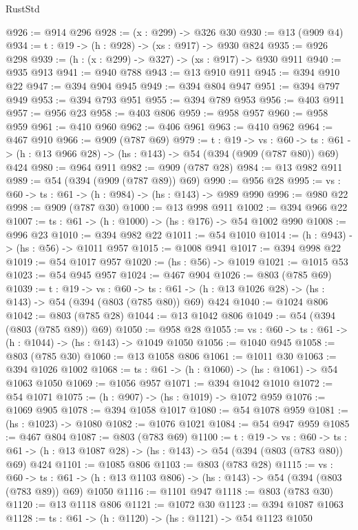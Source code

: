 \begin{lexlean}{RustStd}
\begin{coremodule}
{\begin{coremodule}
{{{{{{{{{{@926 := @914 @296
@928 := (x : @299) -> @326 @30
@930 := @13 (@909 @4)
@934 := {t : @19} -> (h : @928) -> (xs : @917) -> @930 @824
@935 := @926 @298
@939 := (h : (x : @299) -> @327) -> (xs : @917) -> @930 @911
@940 := @935 @913
@941 := @940 @788
@943 := @13 @910 @911
@945 := @394 @910 @22
@947 := @394 @904 @945
@949 := @394 @804 @947
@951 := @394 @797 @949
@953 := @394 @793 @951
@955 := @394 @789 @953
@956 := @403 @911
@957 := @956 @23
@958 := @403 @806
@959 := @958 @957
@960 := @958 @959
@961 := @410 @960
@962 := @406 @961
@963 := @410 @962
@964 := @467 @910
@966 := @909 (@787 @69)
@979 := {t : @19} ->
  {vs : @60} ->
  {ts : @61} -> (h : @13 @966 @28) -> (hs : @143) -> @54 (@394 (@909 (@787 @80)) @69) @424
@980 := @964 @911
@982 := @909 (@787 @28)
@984 := @13 @982 @911
@989 := @54 (@394 (@909 (@787 @89)) @69)
@990 := @956 @28
@995 := {vs : @60} -> {ts : @61} -> (h : @984) -> (hs : @143) -> @989 @990
@996 := @980 @22
@998 := @909 (@787 @30)
@1000 := @13 @998 @911
@1002 := @394 @966 @22
@1007 := {ts : @61} -> (h : @1000) -> (hs : @176) -> @54 @1002 @990
@1008 := @996 @23
@1010 := @394 @982 @22
@1011 := @54 @1010
@1014 := (h : @943) -> (hs : @56) -> @1011 @957
@1015 := @1008 @941
@1017 := @394 @998 @22
@1019 := @54 @1017 @957
@1020 := (hs : @56) -> @1019
@1021 := @1015 @53
@1023 := @54 @945 @957
@1024 := @467 @904
@1026 := @803 (@785 @69)
@1039 := {t : @19} ->
  {vs : @60} ->
  {ts : @61} -> (h : @13 @1026 @28) -> (hs : @143) -> @54 (@394 (@803 (@785 @80)) @69) @424
@1040 := @1024 @806
@1042 := @803 (@785 @28)
@1044 := @13 @1042 @806
@1049 := @54 (@394 (@803 (@785 @89)) @69)
@1050 := @958 @28
@1055 := {vs : @60} -> {ts : @61} -> (h : @1044) -> (hs : @143) -> @1049 @1050
@1056 := @1040 @945
@1058 := @803 (@785 @30)
@1060 := @13 @1058 @806
@1061 := @1011 @30
@1063 := @394 @1026 @1002
@1068 := {ts : @61} -> (h : @1060) -> (hs : @1061) -> @54 @1063 @1050
@1069 := @1056 @957
@1071 := @394 @1042 @1010
@1072 := @54 @1071
@1075 := (h : @907) -> (hs : @1019) -> @1072 @959
@1076 := @1069 @905
@1078 := @394 @1058 @1017
@1080 := @54 @1078 @959
@1081 := (hs : @1023) -> @1080
@1082 := @1076 @1021
@1084 := @54 @947 @959
@1085 := @467 @804
@1087 := @803 (@783 @69)
@1100 := {t : @19} ->
  {vs : @60} ->
  {ts : @61} -> (h : @13 @1087 @28) -> (hs : @143) -> @54 (@394 (@803 (@783 @80)) @69) @424
@1101 := @1085 @806
@1103 := @803 (@783 @28)
@1115 := {vs : @60} ->
  {ts : @61} -> (h : @13 @1103 @806) -> (hs : @143) -> @54 (@394 (@803 (@783 @89)) @69) @1050
@1116 := @1101 @947
@1118 := @803 (@783 @30)
@1120 := @13 @1118 @806
@1121 := @1072 @30
@1123 := @394 @1087 @1063
@1128 := {ts : @61} -> (h : @1120) -> (hs : @1121) -> @54 @1123 @1050
}}}}}}}}}}
\end{coremodule}}
\end{coremodule}
\end{lexlean}
